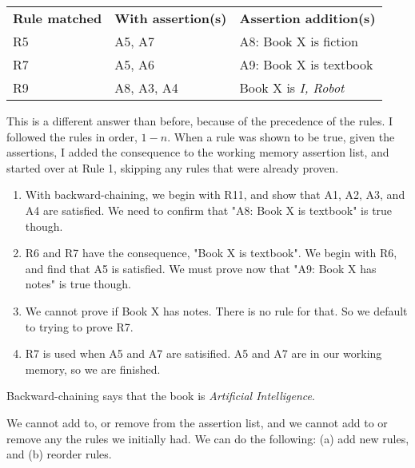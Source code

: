 \documentclass[11pt,largemargins, anonymous]{homework}
\begin{document}
\begin{arabicparts}

\questionpart

\begin{tabular}{lll}
    \textbf{Rule matched} & \textbf{With assertion(s)} & \textbf{Assertion addition(s)} \\
    R5 & A5, A7 & A8: Book X is fiction \\
    R7 & A5, A6 & A9: Book X is textbook \\
    R9 & A8, A3, A4 & Book X is \textit{I, Robot}
\end{tabular}

This is a different answer than before, because of the precedence of the rules.
I followed the rules in order, $1-n$.
When a rule was shown to be true, given the assertions,
I added the consequence to the working memory assertion list,
and started over at Rule 1, skipping any rules that were already proven.

\questionpart

\begin{enumerate}

    \item With backward-chaining, we begin with R11,
    and show that A1, A2, A3, and A4 are satisfied.
    We need to confirm that "A8: Book X is textbook" is true though.

    \item R6 and R7 have the consequence, "Book X is textbook".
    We begin with R6, and find that A5 is satisfied.
    We must prove now that "A9: Book X has notes" is true though.

    \item We cannot prove if Book X has notes. There is no rule for that.
    So we default to trying to prove R7.

    \item R7 is used when A5 and A7 are satisified. A5 and A7 are in our working memory,
    so we are finished.

\end{enumerate}

Backward-chaining says that the book is \textit{Artificial Intelligence}.

\end{arabicparts}

\question

We cannot add to, or remove from the assertion list,
and we cannot add to or remove any the rules we initially had.
We can do the following:
(a) add new rules, and
(b) reorder rules.
\end{document}

